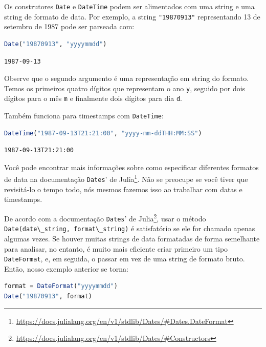 \documentclass[
  notoc %
]{tufte-book}
\DeclareRobustCommand{\href}[2]{#2\footnote{\url{#1}}}
\newcommand{\passthrough}[1]{#1}
\begin{document}
Os construtores \passthrough{\lstinline!Date!} e
\passthrough{\lstinline!DateTime!} podem ser alimentados com uma string
e uma string de formato de data. Por exemplo, a string
\passthrough{\lstinline!"19870913"!} representando 13 de setembro de
1987 pode ser parseada com:

\begin{lstlisting}[language=Julia]
Date("19870913", "yyyymmdd")
\end{lstlisting}

\begin{lstlisting}[language=Output]
1987-09-13
\end{lstlisting}

Observe que o segundo argumento é uma representação em string do
formato. Temos os primeiros quatro dígitos que representam o ano
\passthrough{\lstinline!y!}, seguido por dois dígitos para o mês
\passthrough{\lstinline!m!} e finalmente dois dígitos para dia
\passthrough{\lstinline!d!}.

Também funciona para timestamps com \passthrough{\lstinline!DateTime!}:

\begin{lstlisting}[language=Julia]
DateTime("1987-09-13T21:21:00", "yyyy-mm-ddTHH:MM:SS")
\end{lstlisting}

\begin{lstlisting}[language=Output]
1987-09-13T21:21:00
\end{lstlisting}

Você pode encontrar mais informações sobre como especificar diferentes
formatos de data na
\href{https://docs.julialang.org/en/v1/stdlib/Dates/\#Dates.DateFormat}{documentação
\passthrough{\lstinline!Dates!}' de Julia}. Não se preocupe se você
tiver que revisitá-lo o tempo todo, nós mesmos fazemos isso ao trabalhar
com datas e timestamps.

De acordo com a
\href{https://docs.julialang.org/en/v1/stdlib/Dates/\#Constructors}{documentação
\passthrough{\lstinline!Dates!}' de Julia}, usar o método
\passthrough{\lstinline!Date(date\_string, format\_string)!} é
satisfatório se ele for chamado apenas algumas vezes. Se houver muitas
strings de data formatadas de forma semelhante para analisar, no
entanto, é muito mais eficiente criar primeiro um tipo
\passthrough{\lstinline!DateFormat!}, e, em seguida, o passar em vez de
uma string de formato bruto. Então, nosso exemplo anterior se torna:

\begin{lstlisting}[language=Julia]
format = DateFormat("yyyymmdd")
Date("19870913", format)
\end{lstlisting}
\end{document}
